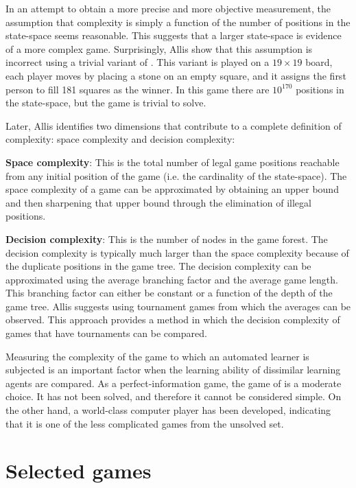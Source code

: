 In an attempt to obtain a more precise and more objective measurement, the assumption that complexity is simply a function of the number of positions in the state-space seems reasonable. This suggests that a larger state-space is evidence of a more complex game.  Surprisingly, Allis \etal \cite{allis:survive} show that this assumption is incorrect using a trivial variant of . This variant is played on a $19 \times 19$ board, each player moves by placing a stone on an empty square, and it assigns the first person to fill 181 squares as the winner.  In this game there are $10^{170}$ positions in the state-space, but the game is trivial to solve. 

Later, Allis \cite{allis:which} identifies two dimensions that contribute to a complete definition of complexity: space complexity and decision complexity: 
\begin{mydesclist}
\item {\bf Space complexity}: This is the total number of legal game positions reachable from any initial position of the game (i.e. the cardinality of the state-space). The space complexity of a game can be approximated by obtaining an upper bound and then sharpening that upper bound through the elimination of illegal positions.
\item {\bf Decision complexity}: This is the number of nodes in the game forest.   The decision complexity is typically much larger than the space complexity because of the duplicate positions in the game tree.   The decision complexity can be approximated using the average branching factor and the average game length.  This branching factor can either be constant or a function of the depth of the game tree.  Allis suggests using tournament games from which the averages can be observed.   This approach provides a method in which the decision complexity of games that have tournaments can be compared.
\end{mydesclist}

Measuring the complexity of the game to which an automated learner is subjected is an important factor when the learning ability of dissimilar learning agents are compared. As a perfect-information game, the game of  is a moderate choice.  It has not been solved, and therefore it cannot be considered simple. On the other hand, a world-class computer player has been developed, indicating that it is one of the less complicated games from the unsolved set. 

\section{Selected games}
